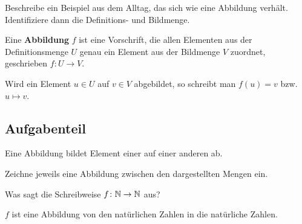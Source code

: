 \documentclass[]{uebungsblatt}
\begin{document}
\begin{exercise}
    Beschreibe ein Beispiel aus dem Alltag, das sich wie eine Abbildung verhält. Identifiziere dann die Definitions- und Bildmenge.
    \begin{answerbox}[.5in]
    \end{answerbox}
\end{exercise}

\begin{definition}
    \parpic[r]{
        
    }
    
    Eine \textbf{Abbildung} $f$ ist eine Vorschrift, die allen Elementen aus der Definitionsmenge $U$ genau ein Element aus der Bildmenge $V$ zuordnet, geschrieben $f\colon U\rightarrow V$. 
    
    Wird ein Element $u\in U$ auf $v\in V$ abgebildet, so schreibt man $f(u)=v$ bzw. $u\mapsto v$.
\end{definition}

\subsection*{Aufgabenteil}
\begin{exercise}
    Eine Abbildung bildet  Element einer  auf   einer anderen  ab.
\end{exercise}

\begin{exercise}
    Zeichne jeweils eine Abbildung zwischen den dargestellten Mengen ein.
    \begin{multicols}{2}
        
        
        
    \end{multicols}
\end{exercise}

\begin{exercise}
    Was sagt die Schreibweise $f\colon\mathbb{N}\rightarrow\mathbb{N}$ aus?
    \begin{answerbox}[0.6in]
        $f$ ist eine Abbildung von den natürlichen Zahlen in die natürliche Zahlen.
    \end{answerbox}
\end{exercise}
\end{document}
